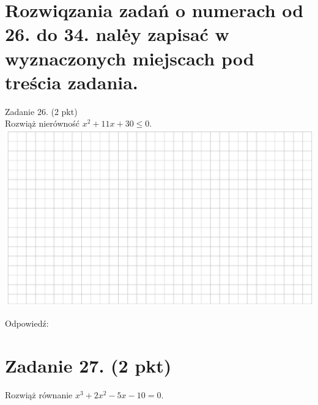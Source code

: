 \documentclass[10pt]{article}
\begin{document}
\section*{Rozwiqzania zadań o numerach od 26. do 34. nalė̇y zapisać w wyznaczonych miejscach pod treścia zadania.}
Zadanie 26. (2 pkt)\\
Rozwiąż nierówność \(x^{2}+11 x+30 \leq 0\).\\
\includegraphics[max width=\textwidth, center]{2024_11_21_603d5c1b2a7d8d68f45fg-12}

Odpowiedź:

\section*{Zadanie 27. (2 pkt)}
Rozwiąż równanie \(x^{3}+2 x^{2}-5 x-10=0\).
\end{document}
